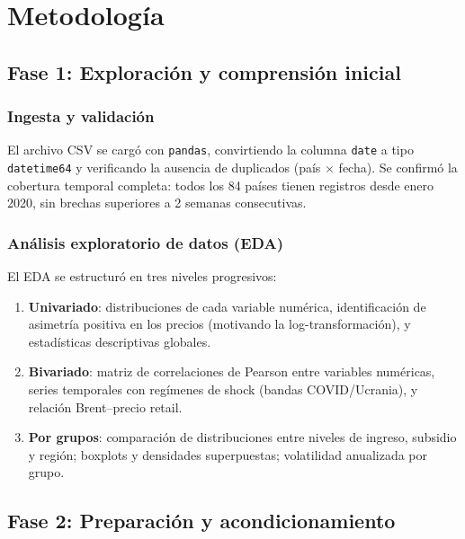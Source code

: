 \documentclass[stu, 12pt, a4paper, biblatex, donotrepeattitle]{apa7}
\begin{document}
\section{Metodología}

\subsection{Fase 1: Exploración y comprensión inicial}

\subsubsection{Ingesta y validación}

El archivo CSV se cargó con \texttt{pandas}, convirtiendo la columna \texttt{date} a tipo \texttt{datetime64} y verificando la ausencia de duplicados (país $\times$ fecha). Se confirmó la cobertura temporal completa: todos los 84 países tienen registros desde enero 2020, sin brechas superiores a 2 semanas consecutivas.

\subsubsection{Análisis exploratorio de datos (EDA)}

El EDA se estructuró en tres niveles progresivos:

\begin{enumerate}
  \item \textbf{Univariado}: distribuciones de cada variable numérica, identificación de asimetría positiva en los precios (motivando la log-transformación), y estadísticas descriptivas globales.
  \item \textbf{Bivariado}: matriz de correlaciones de Pearson entre variables numéricas, series temporales con regímenes de shock (bandas COVID/Ucrania), y relación Brent--precio retail.
  \item \textbf{Por grupos}: comparación de distribuciones entre niveles de ingreso, subsidio y región; boxplots y densidades superpuestas; volatilidad anualizada por grupo.
\end{enumerate}

\subsection{Fase 2: Preparación y acondicionamiento}
\end{document}
